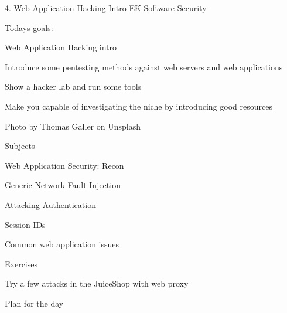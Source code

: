 \documentclass[Screen16to9,17pt]{foils}
\begin{document}
\mytitlepage
{4. Web Application Hacking Intro}
{EK  Software Security}



Todays goals:
\begin{list2}
\item Web Application Hacking intro
\item Introduce some pentesting methods against web servers and web applications
\item Show a hacker lab and run some tools
\item Make you capable of investigating the niche by introducing good resources
\end{list2}

Photo by Thomas Galler on Unsplash



\begin{list1}
\item Subjects
\item Web Application Security: Recon
\begin{list2}
\item Generic Network Fault Injection
\item Attacking Authentication
\item Session IDs
\item Common web application issues
\end{list2}
\item Exercises
\begin{list2}
\item  Try a few attacks in the JuiceShop with web proxy
\end{list2}
\end{list1}



Plan for the day
\end{document}
